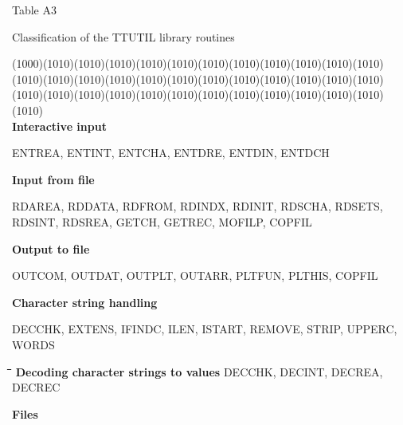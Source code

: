 \documentclass[11pt]{article}
\begin{document}
\bigskip
\bigskip
\bigskip
\bigskip
\bigskip
\bigskip
  \bigskip
Table A3 
\testlastline

\begin{indenting}{2.54cm}
Classification of the TTUTIL library routines
\end{indenting}
\GrBox(1000)\GrBox(1010)\GrBox(1010)\GrBox(1010)\GrBox(1010)\GrBox(1010)\GrBox(1010)\GrBox(1010)\GrBox(1010)\GrBox(1010)\GrBox(1010)\GrBox(1010)\GrBox(1010)\GrBox(1010)\GrBox(1010)\GrBox(1010)\GrBox(1010)\GrBox(1010)\GrBox(1010)\GrBox(1010)\GrBox(1010)\GrBox(1010)\GrBox(1010)\GrBox(1010)\GrBox(1010)\GrBox(1010)\GrBox(1010)\GrBox(1010)\GrBox(1010)\GrBox(1010)\GrBox(1010)\GrBox(1010)\GrBox(1010)\GrBox(1010)\GrBox(1010)\GrBox(1010)\GrBox(1010)\-\\
{\bf Interactive input}
\testlastline

\begin{indenting}{6.35cm}
ENTREA, ENTINT, ENTCHA, ENTDRE, ENT\-DIN, ENTD\-CH 
\end{indenting}
{\bf Input from file}
\testlastline

\begin{indenting}{6.35cm}
RDAREA, RDDATA, RDFROM, RDINDX, RDINIT, RDSCHA,
RDSE\-TS, RDSINT, RDSRE\-A, GETCH, GETREC, MOFILP, COPFIL
\end{indenting}
{\bf Output to file}
\testlastline

\begin{indenting}{6.35cm}
OUTCOM, OUTDAT, OUTPLT, OUTARR, PLTFUN, PLTHIS,
COPFIL
\end{indenting}
{\bf Character string handling}
\testlastline

\begin{indenting}{6.35cm}
DECCHK, EXTENS, IFINDC, ILEN, ISTART, REMOVE, STRIP,
UPPE\-RC, WORDS
\end{indenting}
\begin{tabbing}
\hspace{1.27cm}\=\hspace{1.27cm}\=\hspace{1.27cm}\=\hspace{1.27cm}\=%
\hspace{1.27cm}\=\hspace{1.27cm}\=\hspace{1.27cm}\=\hspace{1.27cm}\=%
\hspace{1.27cm}\=\hspace{1.27cm}\=\kill
{\bf Decoding character strings to values}\> \> \> \> \> DECCHK, DECINT, DECREA, DECREC
\end{tabbing}
{\bf Files}
\testlastline
\end{document}
